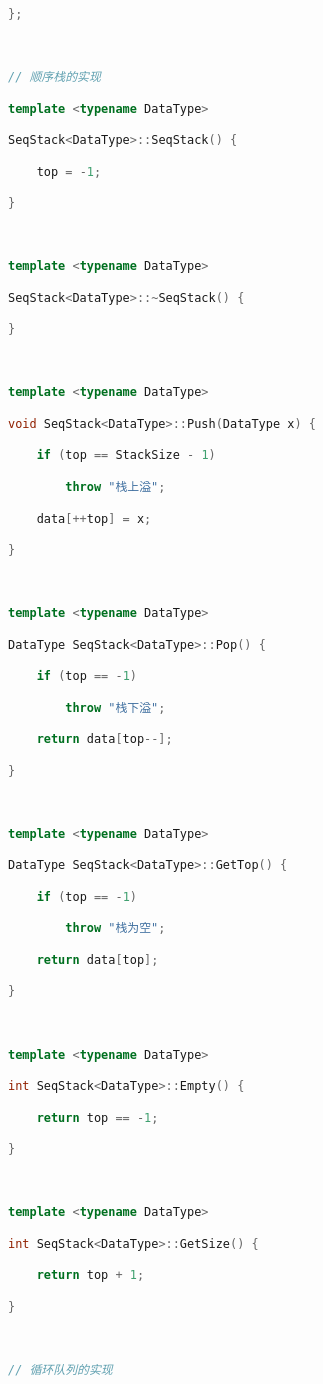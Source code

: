 \begin{lstlisting}[language=C++]
};

  

// 顺序栈的实现

template <typename DataType>

SeqStack<DataType>::SeqStack() {

    top = -1;

}

  

template <typename DataType>

SeqStack<DataType>::~SeqStack() {

}

  

template <typename DataType>

void SeqStack<DataType>::Push(DataType x) {

    if (top == StackSize - 1)

        throw "栈上溢";

    data[++top] = x;

}

  

template <typename DataType>

DataType SeqStack<DataType>::Pop() {

    if (top == -1)

        throw "栈下溢";

    return data[top--];

}

  

template <typename DataType>

DataType SeqStack<DataType>::GetTop() {

    if (top == -1)

        throw "栈为空";

    return data[top];

}

  

template <typename DataType>

int SeqStack<DataType>::Empty() {

    return top == -1;

}

  

template <typename DataType>

int SeqStack<DataType>::GetSize() {

    return top + 1;

}

  

// 循环队列的实现


\end{lstlisting}
